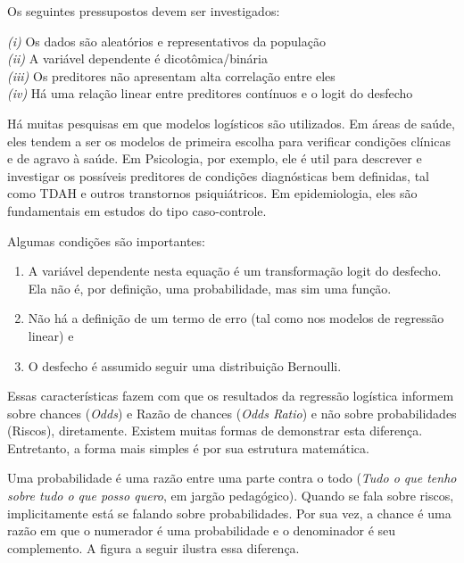 \documentclass[
]{book}
\providecommand{\tightlist}{%
  \setlength{\itemsep}{0pt}\setlength{\parskip}{0pt}}
\begin{document}
Os seguintes pressupostos devem ser investigados:

\emph{(i)} Os dados são aleatórios e representativos da população\\
\emph{(ii)} A variável dependente é dicotômica/binária\\
\emph{(iii)} Os preditores não apresentam alta correlação entre eles\\
\emph{(iv)} Há uma relação linear entre preditores contínuos e o logit do desfecho

Há muitas pesquisas em que modelos logísticos são utilizados. Em áreas de saúde, eles tendem a ser os modelos de primeira escolha para verificar condições clínicas e de agravo à saúde. Em Psicologia, por exemplo, ele é util para descrever e investigar os possíveis preditores de condições diagnósticas bem definidas, tal como TDAH e outros transtornos psiquiátricos. Em epidemiologia, eles são fundamentais em estudos do tipo caso-controle.

Algumas condições são importantes:

\begin{enumerate}
\def\labelenumi{(\arabic{enumi})}
\tightlist
\item
  A variável dependente nesta equação é um transformação logit do desfecho. Ela não é, por definição, uma probabilidade, mas sim uma função.\\
\item
  Não há a definição de um termo de erro (tal como nos modelos de regressão linear) e\\
\item
  O desfecho é assumido seguir uma distribuição Bernoulli.
\end{enumerate}

Essas características fazem com que os resultados da regressão logística informem sobre chances (\emph{Odds}) e Razão de chances (\emph{Odds Ratio}) e não sobre probabilidades (Riscos), diretamente. Existem muitas formas de demonstrar esta diferença. Entretanto, a forma mais simples é por sua estrutura matemática.

Uma probabilidade é uma razão entre uma parte contra o todo (\emph{Tudo o que tenho sobre tudo o que posso quero}, em jargão pedagógico). Quando se fala sobre riscos, implicitamente está se falando sobre probabilidades. Por sua vez, a chance é uma razão em que o numerador é uma probabilidade e o denominador é seu complemento. A figura a seguir ilustra essa diferença.
\end{document}
